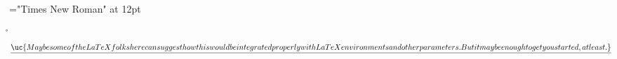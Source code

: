 \font\uc="Times New Roman" at 12pt
 \r\n
$\underline{\uc{Maybe some of the LaTeX folks here can suggest how this would be integrated properly with LaTeX environments and other parameters. But it may be enough to get you started, at least. }
}$

\bye
